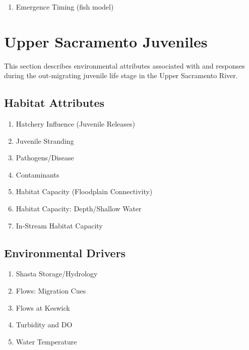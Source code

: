 \documentclass[
]{book}
\providecommand{\tightlist}{%
  \setlength{\itemsep}{0pt}\setlength{\parskip}{0pt}}
\theoremstyle{definition}
\theoremstyle{definition}
\theoremstyle{definition}
\theoremstyle{definition}
\theoremstyle{remark}
\begin{document}
\begin{enumerate}
\def\labelenumi{\arabic{enumi}.}
\setcounter{enumi}{2}
\tightlist
\item
  Emergence Timing (fish model)
\end{enumerate}

\hypertarget{upper-sacramento-juveniles}{%
\chapter{Upper Sacramento Juveniles}\label{upper-sacramento-juveniles}}

This section describes environmental attributes associated with and responses during the out-migrating juvenile life stage in the Upper Sacramento River.

\hypertarget{habitat-attributes-2}{%
\section{Habitat Attributes}\label{habitat-attributes-2}}

\begin{enumerate}
\def\labelenumi{\arabic{enumi}.}
\item
  Hatchery Influence (Juvenile Releases)
\item
  Juvenile Stranding
\item
  Pathogens/Disease
\item
  Contaminants
\item
  Habitat Capacity (Floodplain Connectivity)
\item
  Habitat Capacity: Depth/Shallow Water
\item
  In-Stream Habitat Capacity
\end{enumerate}

\hypertarget{environmental-drivers-1}{%
\section{Environmental Drivers}\label{environmental-drivers-1}}

\begin{enumerate}
\def\labelenumi{\arabic{enumi}.}
\item
  Shasta Storage/Hydrology
\item
  Flows: Migration Cues
\item
  Flows at Keswick
\item
  Turbidity and DO
\item
  Water Temperature
\end{enumerate}
\end{document}
